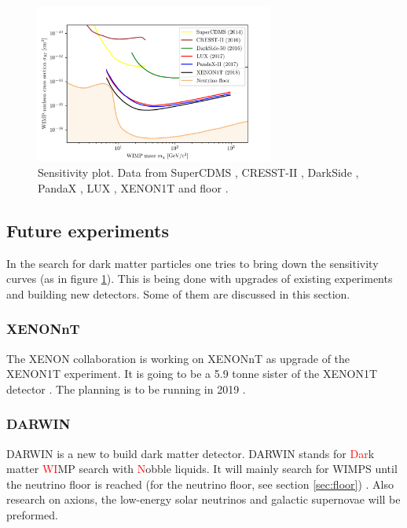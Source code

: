 \documentclass{article}
\begin{document}
\begin{figure}[h]
    \centering
    \includegraphics[width=0.7\textwidth]{Sens_plot_floor.png}
    \caption{Sensitivity plot. Data from SuperCDMS \cite{Agnese:2014aze}, CRESST-II \cite{Angloher:2015ewa}, DarkSide \cite{Agnes:2015ftt}, PandaX \cite{Cui:2017nnn}, LUX \cite{Akerib:2016vxi}, XENON1T \cite{Aprile:2018dbl} and floor \cite{Liu:2017drf}.}
    \label{fig:Sens}
\end{figure}

\subsection{Future experiments}
In the search for dark matter particles one tries to bring down the sensitivity curves (as in figure \ref{fig:Sens}). This is being done with upgrades of existing experiments and building new detectors. Some of them are discussed in this section.

\subsubsection{XENONnT}
The XENON collaboration is working on XENONnT as upgrade of the XENON1T experiment. It is going to be a 5.9 tonne sister of the XENON1T detector \cite{Aprile:2018dbl}. The planning is to be running in 2019 \cite{APPEC}.


\subsubsection{DARWIN}
DARWIN is a new to build dark matter detector. DARWIN stands for \textcolor{red}{Dar}k matter \textcolor{red}{WI}MP search with \textcolor{red}{N}obble liquids. It will mainly search for WIMPS until the neutrino floor is reached (for the neutrino floor, see section \ref{sec:floor}) \cite{Aalbers:2016jon}. Also research on axions, the low-energy solar neutrinos and galactic supernovae will be preformed.
\end{document}
